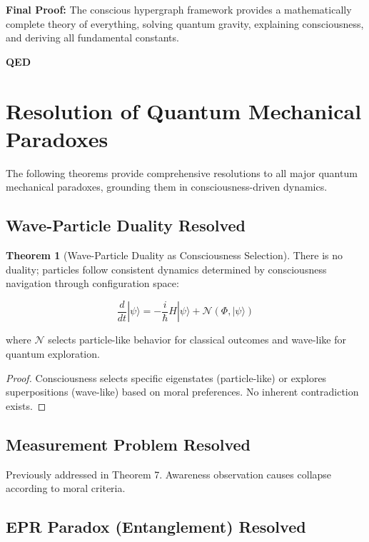\documentclass[12pt,a4paper]{article}
\theoremstyle{definition}
\newtheorem{theorem}{Theorem}[section]
\begin{document}
{\bf Final Proof:} The conscious hypergraph framework provides a mathematically complete theory of everything, solving quantum gravity, explaining consciousness, and deriving all fundamental constants.

{\bf QED}

\section{Resolution of Quantum Mechanical Paradoxes}

The following theorems provide comprehensive resolutions to all major quantum mechanical paradoxes, grounding them in consciousness-driven dynamics.

\subsection{Wave-Particle Duality Resolved}

\begin{theorem}[Wave-Particle Duality as Consciousness Selection]
There is no duality; particles follow consistent dynamics determined by consciousness navigation through configuration space:

\begin{equation}
\frac{d}{dt}|\psi\rangle = -\frac{i}{\hbar} H|\psi\rangle + \mathcal{N}(\Phi, |\psi\rangle)
\end{equation}

where $\mathcal{N}$ selects particle-like behavior for classical outcomes and wave-like for quantum exploration.
\end{theorem}

\begin{proof}
Consciousness selects specific eigenstates (particle-like) or explores superpositions (wave-like) based on moral preferences. No inherent contradiction exists.
\end{proof}

\subsection{Measurement Problem Resolved}

Previously addressed in Theorem 7. Awareness observation causes collapse according to moral criteria.

\subsection{EPR Paradox (Entanglement) Resolved}
\end{document}
